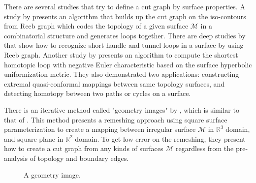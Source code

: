 \documentclass[a4paper,twoside]{article}
\begin{document}
There are several studies that try to define a cut graph by surface properties. A study by \cite{Patane:2007:FCB:1224804.1224947} presents an algorithm that builds up the cut graph on the iso-contours from Reeb graph which codes the topology of a given surface $\mathscr{M}$ in a combinatorial structure and generates loops together. There are deep studies by \cite{Dey:2008:CGH:1360612.1360644,Dey:2013:ECH:2461912.2462017} that show how to recognize short handle and tunnel loops in a surface by using Reeb graph.  Another study by \cite{Jin:2013:CSH:2396897.2396971} presents an algorithm to compute the shortest homotopic loop with negative Euler characteristic based on the surface hyperbolic uniformization metric. They also demonstrated two applications: constructing extremal quasi-conformal mappings between same topology surfaces, and detecting homotopy between two paths or cycles on a surface. 

There is an iterative method called "geometry images" by \cite{Gu:2002:GI:566654.566589}, which is similar to that of \cite{Dey:1994:NTC:177424.178001}. This method presents a remeshing approach using square surface parameterization to create a mapping between irregular surface $\mathscr{M}$ in $\mathbb{R}^3$ domain, and square plane in $\mathbb{R}^2$ domain. To get low error on the remeshing, they present how to create a cut graph from any kinds of surfaces $\mathscr{M}$ regardless from the pre-analysis of topology and boundary edges.

\begin{figure}[!h]
	\centering
	\hspace{10pt}
	
	\caption{A geometry image.}
	\label{fig:gim figure}
\end{figure}
\end{document}

